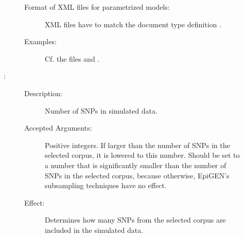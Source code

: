 \documentclass[a4paper,10pt,english]{sphinxhowto}
\begin{document}
\begin{description}
\begin{description}
\begin{description}
\begin{sphinxVerbatim}[commandchars=\\\{\}]
\PYG{p}{[} \PYG{p}{]}
  
  
\PYG{p}{[} \PYG{p}{]}
  
  
\end{sphinxVerbatim}

\item[{Format of XML files for parametrized models:}] \leavevmode
XML files have to match the document type definition .

\item[{Examples:}] \leavevmode
Cf. the files  and .

\end{description}

\item[{\sphinxcode{\sphinxupquote{-{-}snps SNPS}}:}] \leavevmode\begin{description}
\item[{Description:}] \leavevmode
Number of SNPs in simulated data.

\item[{Accepted Arguments:}] \leavevmode
Positive integers. If larger than the number of SNPs in the selected corpus, it is lowered to this number.
Should be set to a number that is significantly smaller than the number of SNPs in the selected corpus,
because otherwise, EpiGEN’s subsampling techniques have no effect.

\item[{Effect:}] \leavevmode
Determines how many SNPs from the selected corpus are included in the simulated data.

\end{description}


\end{description}
\end{description}
\end{document}
